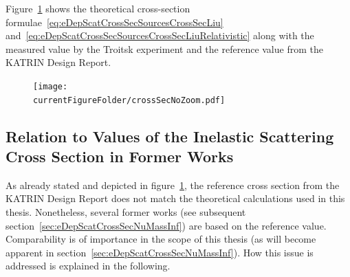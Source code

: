 Figure~\ref{fig:eDepScatCrossSecSourcesValues} shows the theoretical cross-section formulae~\eqref{eq:eDepScatCrossSecSourcesCrossSecLiu} and~\eqref{eq:eDepScatCrossSecSourcesCrossSecLiuRelativistic} along with the measured value by the Troitsk experiment and the reference value from the KATRIN Design Report.

\begin{figure}[t]
	\centering
	\texttt{[image: \\currentFigureFolder/crossSecNoZoom.pdf]}
	\label{fig:eDepScatCrossSecSourcesValues}
\end{figure}

\subsection{Relation to Values of the Inelastic Scattering Cross Section in Former Works}
\label{sec:eDepScatCrossSecSourcesChoice}
As already stated and depicted in figure~\ref{fig:eDepScatCrossSecSourcesValues}, the reference cross section from the KATRIN Design Report does not match the theoretical calculations used in this thesis. Nonetheless, several former works (see subsequent section~\ref{sec:eDepScatCrossSecNuMassInf}) are based on the reference value. Comparability is of importance in the scope of this thesis (as will become apparent in section~\ref{sec:eDepScatCrossSecNuMassInf}). How this issue is addressed is explained in the following.

